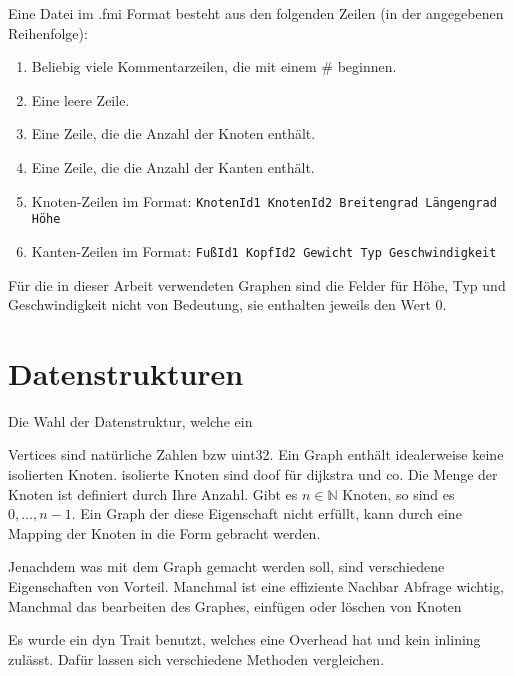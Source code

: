 \begin{definition}
    Eine Datei im .fmi Format besteht aus den folgenden Zeilen (in der angegebenen Reihenfolge):
    \begin{enumerate}
        \item
              Beliebig viele Kommentarzeilen, die mit einem \# beginnen.

        \item
              Eine leere Zeile.

        \item
              Eine Zeile, die die Anzahl der Knoten enthält.

        \item
              Eine Zeile, die die Anzahl der Kanten enthält.

        \item
              Knoten-Zeilen im Format: \texttt{KnotenId1 KnotenId2 Breitengrad Längengrad Höhe}

        \item
              Kanten-Zeilen im Format: \texttt{FußId1 KopfId2 Gewicht Typ Geschwindigkeit}

    \end{enumerate}
\end{definition}

Für die in dieser Arbeit verwendeten Graphen sind die Felder für Höhe, Typ und Geschwindigkeit nicht von Bedeutung, sie enthalten jeweils den Wert 0.

\section{Datenstrukturen}

Die Wahl der Datenstruktur, welche ein

Vertices sind natürliche Zahlen bzw uint32.
Ein Graph enthält idealerweise keine isolierten Knoten.
isolierte Knoten sind doof für dijkstra und co.
Die Menge der Knoten ist definiert durch Ihre Anzahl.
Gibt es $n \in \mathbb{N}$ Knoten, so sind es $0, \dotsc, n - 1$.
Ein Graph der diese Eigenschaft nicht erfüllt, kann durch eine Mapping der Knoten in die Form gebracht werden.

Jenachdem was mit dem Graph gemacht werden soll, sind verschiedene Eigenschaften von Vorteil.
Manchmal ist eine effiziente Nachbar Abfrage wichtig,
Manchmal das bearbeiten des Graphes, einfügen oder löschen von Knoten

Es wurde ein dyn Trait benutzt, welches eine Overhead hat und kein inlining zulässt.
Dafür lassen sich verschiedene Methoden vergleichen.


